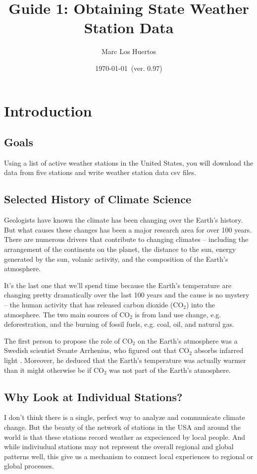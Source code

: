 \documentclass{article}\usepackage[]{graphicx}\usepackage[dvipsnames]{xcolor}
\title{Guide 1: Obtaining State Weather Station Data}
\author{Marc Los Huertos}
\date{\today~(ver. 0.97)}
\begin{document}
\maketitle

\section{Introduction}

\subsection{Goals}

Using a list of active weather stations in the United States, you  will download the data from five stations and write weather station data csv files. 

\subsection{Selected History of Climate Science}

Geologists have known the climate has been changing over the Earth's history. But what causes these changes has been a major research area for over 100 years. There are numerous drivers that contribute to changing climates -- including the arrangement of the continents on the planet, the distance to the sun, energy generated by the sun, volanic activity, and the composition of the Earth's atmosphere. 

It's the last one that we'll spend time because the Earth's temperature are changing pretty dramatically over the last 100 years and the cause is no mystery -- the human activity that has released carbon dioxide (CO$_2$) into the atmosphere. The two main sources of CO$_2$ is from land use change, e.g. deforestration, and the burning of fossil fuels, e.g. coal, oil, and natural gas. 

The first person to propose the role of CO$_2$ on the Earth's atmosphere was a Swedish scientist Svante Arrhenius, who figured out that CO$_2$ absorbs infarred light \citep{rodhe1997svante}. Moreover, he deduced that the Earth's temperature was actually warmer than it might otherwise be if CO$_2$ was not part of the Earth's atmosphere. 

\subsection{Why Look at Individual Stations?}

I don't think there is a single, perfect way to analyze and communicate climate change. But the beauty of the network of stations in the USA and around the world is that these stations record weather as expecienced by local people. And while indiviudual stations may not represent the overall regional and global patterns well, this give us a mechanism to connect local experiences to regional or global processes. 
\end{document}
